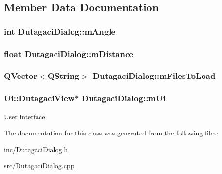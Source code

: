 \subsection{Member Data Documentation}
\hypertarget{class_dutagaci_dialog_acf6158ec2765efe1c6b8d4ef94eb14ff}{
\subsubsection[{m\+Angle}]{\setlength{\rightskip}{0pt plus 5cm}int Dutagaci\+Dialog\+::m\+Angle\hspace{0.3cm}{\ttfamily [private]}}}\label{class_dutagaci_dialog_acf6158ec2765efe1c6b8d4ef94eb14ff}
\hypertarget{class_dutagaci_dialog_a5aa43ab7213d5a88caad384c94141cbf}{
\subsubsection[{m\+Distance}]{\setlength{\rightskip}{0pt plus 5cm}float Dutagaci\+Dialog\+::m\+Distance\hspace{0.3cm}{\ttfamily [private]}}}\label{class_dutagaci_dialog_a5aa43ab7213d5a88caad384c94141cbf}
\hypertarget{class_dutagaci_dialog_a4a1130da190ed6fb4a941bb2236d219c}{
\subsubsection[{m\+Files\+To\+Load}]{\setlength{\rightskip}{0pt plus 5cm}Q\+Vector$<$Q\+String$>$ Dutagaci\+Dialog\+::m\+Files\+To\+Load\hspace{0.3cm}{\ttfamily [private]}}}\label{class_dutagaci_dialog_a4a1130da190ed6fb4a941bb2236d219c}
\hypertarget{class_dutagaci_dialog_a3ce0e7c4ba85b03b92859701b5f9cfc4}{
\subsubsection[{m\+Ui}]{\setlength{\rightskip}{0pt plus 5cm}Ui\+::\+Dutagaci\+View$\ast$ Dutagaci\+Dialog\+::m\+Ui\hspace{0.3cm}{\ttfamily [private]}}}\label{class_dutagaci_dialog_a3ce0e7c4ba85b03b92859701b5f9cfc4}


User interface. 



The documentation for this class was generated from the following files\+:\begin{DoxyCompactItemize}
\item 
inc/\hyperlink{_dutagaci_dialog_8h}{Dutagaci\+Dialog.\+h}\item 
src/\hyperlink{_dutagaci_dialog_8cpp}{Dutagaci\+Dialog.\+cpp}\end{DoxyCompactItemize}
